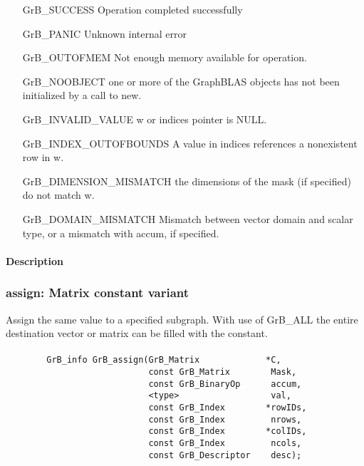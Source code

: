 \begin{itemize}[leftmargin=2.1in]
\item[{\sf GrB\_SUCCESS}]             Operation completed successfully
\item[{\sf GrB\_PANIC}]               Unknown internal error
\item[{\sf GrB\_OUTOFMEM}]            Not enough memory available for operation.
\item[{\sf GrB\_NOOBJECT}]          one or more of the GraphBLAS objects has
                                    not been initialized by a call to {\sf new}.
\item[{\sf GrB\_INVALID\_VALUE}]    {\sf w} or {\sf indices} pointer is {\sf NULL}.
\item[{\sf GrB\_INDEX\_OUTOFBOUNDS}]
        A value in indices references a nonexistent row in {\sf w}.
\item[{\sf GrB\_DIMENSION\_MISMATCH}] 
        the dimensions of the mask (if specified) do not match {\sf w}.
\item[{\sf GrB\_DOMAIN\_MISMATCH}]    Mismatch between vector domain and scalar type,
                                      or a mismatch with {\sf accum}, if specified.
\end{itemize}


\paragraph{Description}

\subsubsection{{\sf assign}: Matrix constant variant}

Assign the same value to a specified subgraph.  With use of {\sf GrB\_ALL} the entire
destination vector or matrix can be filled with the constant.

\paragraph{\syntax}

\begin{verbatim}
        GrB_info GrB_assign(GrB_Matrix             *C,
                            const GrB_Matrix        Mask,
                            const GrB_BinaryOp      accum,
                            <type>                  val,
                            const GrB_Index        *rowIDs,
                            const GrB_Index         nrows,
                            const GrB_Index        *colIDs,
                            const GrB_Index         ncols,
                            const GrB_Descriptor    desc);
\end{verbatim}

